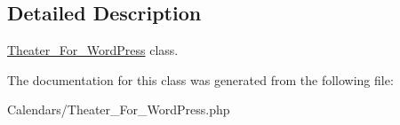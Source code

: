 \subsection{Detailed Description}
\hyperlink{classJeero_1_1Calendars_1_1Theater__For__WordPress}{Theater\+\_\+\+For\+\_\+\+Word\+Press} class. 

The documentation for this class was generated from the following file\+:\begin{DoxyCompactItemize}
\item 
Calendars/Theater\+\_\+\+For\+\_\+\+Word\+Press.\+php\end{DoxyCompactItemize}
